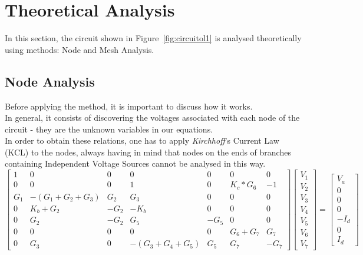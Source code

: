 \section{Theoretical Analysis}
\label{sec:analysis}

In this section, the circuit shown in Figure~\ref{fig:circuitol1} is analysed
theoretically using methods: Node and Mesh Analysis.

\subsection{Node Analysis}
\label{subsec:node_analysis}

Before applying the method, it is important to discuss how it works.\\
In general, it consists of discovering the voltages associated with each node of the circuit - they are the unknown variables in our equations. \\
In order to obtain these relations, one has to apply \textit{Kirchhoff}'s Current Law (KCL) to the nodes, always having in mind that nodes on the ends of branches containing Independent Voltage Sources cannot be analysed in this way. \\

\[
\begin{bmatrix}
1 & 0 & 0 & 0 & 0 & 0 & 0 \\
0 & 0 & 0  & 1 & 0 & K_c*G_6 & -1 \\
G_1 & -(G_1+G_2+G_3) & G_2 & G_3 & 0 & 0 & 0  \\
0 & K_b+G_2 & -G_2 & -K_b & 0 & 0 & 0 \\
0 & G_2 & -G_2 & G_5 & -G_5 & 0 & 0 \\
0 & 0 & 0 & 0 & 0 & G_6+G_7 & G_7 \\
0 & G_3 & 0 & -(G_3+G_4+G_5) & G_5 & G_7 & -G_7
\end{bmatrix}
\begin{bmatrix}
V_1 \\
V_2 \\
V_3 \\
V_4 \\
V_5 \\
V_6 \\
V_7 
\end{bmatrix}
=
\begin{bmatrix}
V_a \\
0 \\
0 \\
0 \\ 
-I_d \\
0 \\
I_d 
\end{bmatrix}
\] \relax


